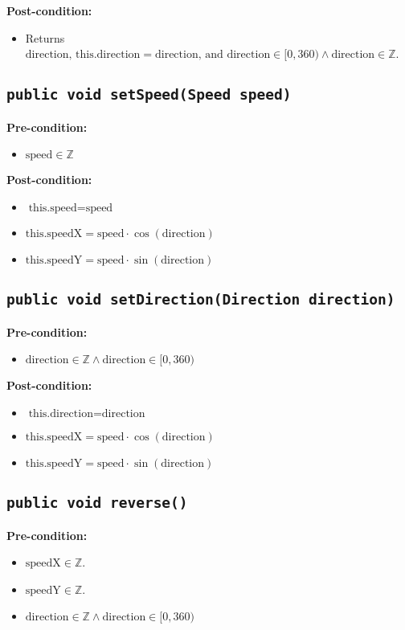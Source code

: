 \documentclass{article}
\begin{document}
\textbf{Post-condition:}
\begin{itemize}
    \item Returns \( \text{direction} \text{, this.direction} = \text{direction, and direction} \in [0,360) \wedge \text{direction} \in \mathbb{Z} \).
\end{itemize}


\subsection*{\texttt{public void setSpeed(Speed speed)}}
\textbf{Pre-condition:}
\begin{itemize}
    \item \( \text{speed} \in \mathbb{Z} \)
\end{itemize}

\textbf{Post-condition:}
\begin{itemize}
    \item \( \text{this.speed} = \text{speed} \)
    \item \( \text{this.speedX} = \text{speed} \cdot \cos(\text{direction}) \)
    \item \( \text{this.speedY} = \text{speed} \cdot \sin(\text{direction}) \)
\end{itemize}


\subsection*{\texttt{public void setDirection(Direction direction)}}
\textbf{Pre-condition:}
\begin{itemize}
     \item \( \text{direction} \in \mathbb{Z} \wedge \text{direction} \in [0,360) \)
\end{itemize}

\textbf{Post-condition:}
\begin{itemize}
    \item \( \text{this.direction} = \text{direction} \)
    \item \( \text{this.speedX} = \text{speed} \cdot \cos(\text{direction}) \)
    \item \( \text{this.speedY} = \text{speed} \cdot \sin(\text{direction}) \)
\end{itemize}


\subsection*{\texttt{public void reverse()}}
\textbf{Pre-condition:}
\begin{itemize}
    \item \( \text{speedX} \in \mathbb{Z} \).
    \item \( \text{speedY} \in \mathbb{Z} \).
    \item \( \text{direction} \in \mathbb{Z} \wedge \text{direction} \in [0,360) \)
\end{itemize}
\end{document}
